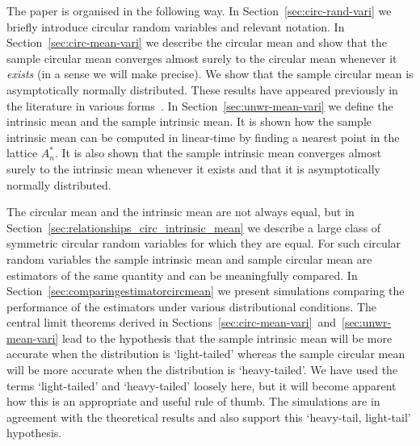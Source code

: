 \documentclass[journal]{../bib/IEEEtran}
\begin{document}

The paper is organised in the following way.  In Section~\ref{sec:circ-rand-vari} we briefly introduce circular random variables and relevant notation. In Section~\ref{sec:circ-mean-vari} we describe the circular mean and show that the sample circular mean converges almost surely to the circular mean whenever it \emph{exists} (in a sense we will make precise). We show that the sample circular mean is asymptotically normally distributed. These results have appeared previously in the literature in various forms~\cite{Quinn2009_dasp_phase_only_information_loss,Fisher_common_mean_direction_dir_est_no_dist_assumptions1983,Jammalamadaka_dir_stat_book,mardia_stat_dir_data_book_1975,Bhattacharya_int_ext_means_2003}.  In Section~\ref{sec:unwr-mean-vari} we define the intrinsic mean and the sample intrinsic mean. It is shown how the sample intrinsic mean can be computed in linear-time by finding a nearest point in the lattice $A_n^*$. It is also shown that the sample intrinsic mean converges almost surely to the intrinsic mean whenever it exists and that it is asymptotically normally distributed. %

The circular mean and the intrinsic mean are not always equal, but in Section~\ref{sec:relationships_circ_intrinsic_mean} we describe a large class of symmetric circular random variables for which they are equal.  For such circular random variables the sample intrinsic mean and sample circular mean are estimators of the same quantity and can be meaningfully compared.  In Section~\ref{sec:comparingestimatorcircmean} we present simulations comparing the performance of the estimators under various distributional conditions.  The central limit theorems derived in Sections~\ref{sec:circ-mean-vari}~and~\ref{sec:unwr-mean-vari} lead to the hypothesis that the sample intrinsic mean will be more accurate when the distribution is `light-tailed' whereas the sample circular mean will be more accurate when the distribution is `heavy-tailed'. We have used the terms `light-tailed' and `heavy-tailed' loosely here, but it will become apparent how this is an appropriate and useful rule of thumb. The simulations are in agreement with the theoretical results and also support this `heavy-tail, light-tail' hypothesis.
 
\end{document}

